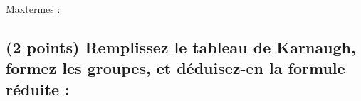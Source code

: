 \documentclass[11pt,a4paper]{article}
\begin{document}
\begin{table}[!ht]
\begin{minipage}{0.50\textwidth}

\bigskip

Maxtermes :

\vspace*{3.6cm}


  \end{minipage}
\end{table}

\vspace*{-0.6cm}

\subsection{(2 points) Remplissez le tableau de Karnaugh, formez les groupes, et déduisez-en la formule réduite : }

\end{document}
